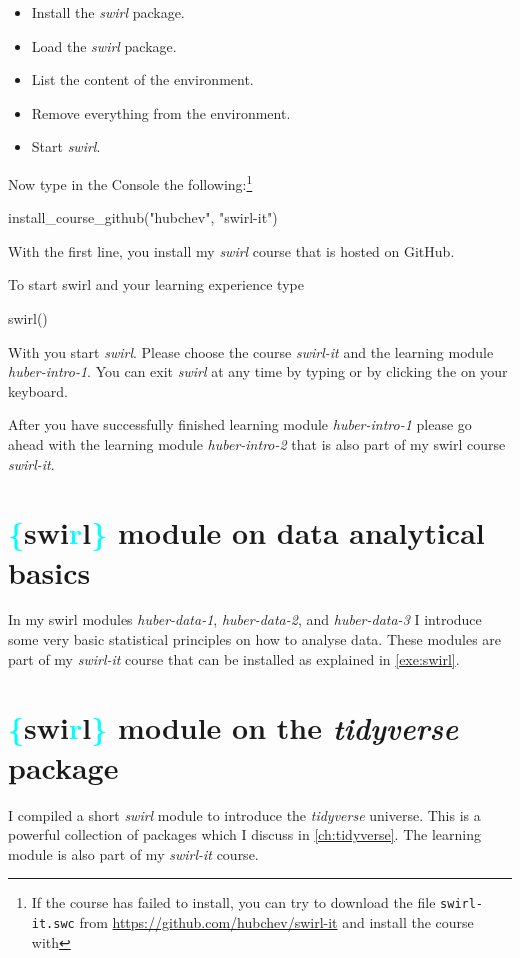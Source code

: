 \begin{itemize}
	\item Install the \textit{swirl} package.
	\item Load the \textit{swirl} package.
	\item List the content of the environment.
	\item Remove everything from the environment.
	\item Start \textit{swirl}.
\end{itemize}

Now type in the Console the following:\footnote{If the course has failed to install, you can try to download the file \texttt{swirl-it.swc} from \url{https://github.com/hubchev/swirl-it} and install the course with }
\begin{rblock1}
	install_course_github("hubchev", "swirl-it")
\end{rblock1}
With the first line, you install my \textit{swirl} course that is hosted on GitHub.

To start swirl and your learning experience type
\begin{rblock1}
	swirl()
\end{rblock1}

With  you start \textit{swirl}. 
Please choose the course \textit{swirl-it} and the learning module \textit{huber-intro-1}.
You can exit \textit{swirl} at any time by typing  or by clicking the  on your keyboard. 

After you have successfully finished learning module \textit{huber-intro-1} please go ahead with the learning module \textit{huber-intro-2} that is also part of my swirl course \textit{swirl-it}.



\section{\textcolor{cyan}{\{}swi\textcolor{cyan}{r}l\textcolor{cyan}{\}} module on data analytical basics}

In my swirl modules \textit{huber-data-1}, \textit{huber-data-2}, and \textit{huber-data-3} I introduce some very basic statistical principles on how to analyse data. These modules are part of my \textit{swirl-it} course that can be installed as explained in \autoref{exe:swirl}.


\section{\textcolor{cyan}{\{}swi\textcolor{cyan}{r}l\textcolor{cyan}{\}} module on the \textit{tidyverse} package}
I compiled a short \textit{swirl} module to introduce the \textit{tidyverse} universe. This is a powerful collection of packages which I discuss in \autoref{ch:tidyverse}. The learning module is also part of my \textit{swirl-it} course.

